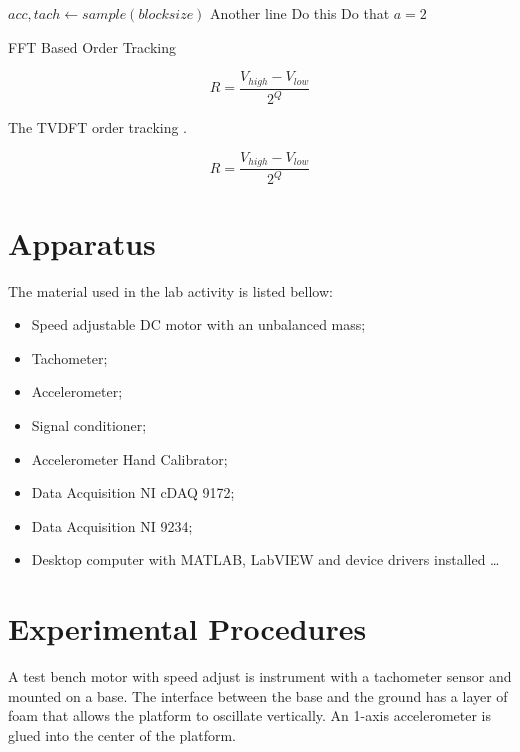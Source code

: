 \documentclass[10pt,letterpaper,twocolumn]{article}
\begin{document}
	\begin{algorithm}
		\begin{algorithmic}[1]
			\STATE $ acc, tach \leftarrow sample(blocksize) $
			\STATE Another line
			\STATE Do this
			\STATE Do that $ a = 2 $
		\end{algorithmic}
		\caption{FFT Based Order Tracking}
		\label{algo:fft}
	\end{algorithm}
	
    \begin{equation}
        R = \dfrac{V_{high} - V_{low}}{2^Q}
        \label{eq:resolution}
    \end{equation} 
	
	The TVDFT order tracking .
	
    \begin{equation}
        R = \dfrac{V_{high} - V_{low}}{2^Q}
        \label{eq:resolution}
    \end{equation} 

\section{Apparatus}
    The material used in the lab activity is listed bellow:

    \begin{itemize}
		\item Speed adjustable DC motor with an unbalanced mass; 
		\item Tachometer; 
		\item Accelerometer;  
		\item Signal conditioner; 
		\item Accelerometer Hand Calibrator; 
		\item Data Acquisition NI cDAQ 9172;
		\item Data Acquisition NI 9234;
		\item Desktop computer with MATLAB, LabVIEW and device drivers installed \ldots
    \end{itemize}


\section{Experimental Procedures}
	A test bench motor with speed adjust is instrument with a tachometer sensor and mounted on a base. The interface between the base and the ground has a layer of foam that allows the platform to oscillate vertically. An 1-axis accelerometer is glued into the center of the platform.
	
\end{document}
